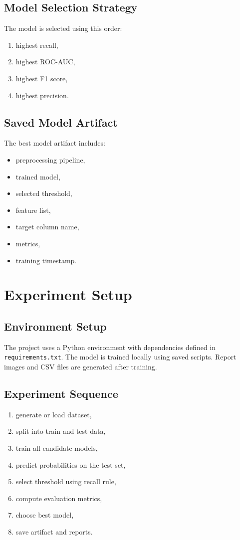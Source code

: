 \documentclass[12pt,a4paper,openany]{report}
\begin{document}
    \section{Model Selection Strategy}
    The model is selected using this order:
    \begin{enumerate}[leftmargin=1.4cm]
    \item highest recall,
    \item highest ROC-AUC,
    \item highest F1 score,
    \item highest precision.
    \end{enumerate}

    \section{Saved Model Artifact}
    The best model artifact includes:
    \begin{itemize}[leftmargin=1.4cm]
    \item preprocessing pipeline,
    \item trained model,
    \item selected threshold,
    \item feature list,
    \item target column name,
    \item metrics,
    \item training timestamp.
    \end{itemize}

    \chapter{Experiment Setup}
    \section{Environment Setup}
    The project uses a Python environment with dependencies defined in \texttt{requirements.txt}. The model is trained locally using saved scripts. Report images and CSV files are generated after training.

    \section{Experiment Sequence}
    \begin{enumerate}[leftmargin=1.4cm]
    \item generate or load dataset,
    \item split into train and test data,
    \item train all candidate models,
    \item predict probabilities on the test set,
    \item select threshold using recall rule,
    \item compute evaluation metrics,
    \item choose best model,
    \item save artifact and reports.
    \end{enumerate}
\end{document}

